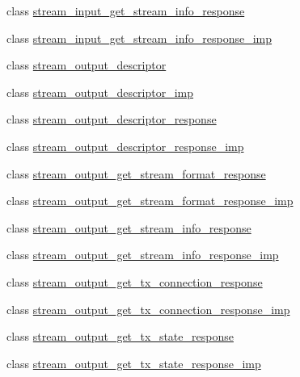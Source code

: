 \begin{DoxyCompactItemize}
\item 
class \hyperlink{classavdecc__lib_1_1stream__input__get__stream__info__response}{stream\+\_\+input\+\_\+get\+\_\+stream\+\_\+info\+\_\+response}
\item 
class \hyperlink{classavdecc__lib_1_1stream__input__get__stream__info__response__imp}{stream\+\_\+input\+\_\+get\+\_\+stream\+\_\+info\+\_\+response\+\_\+imp}
\item 
class \hyperlink{classavdecc__lib_1_1stream__output__descriptor}{stream\+\_\+output\+\_\+descriptor}
\item 
class \hyperlink{classavdecc__lib_1_1stream__output__descriptor__imp}{stream\+\_\+output\+\_\+descriptor\+\_\+imp}
\item 
class \hyperlink{classavdecc__lib_1_1stream__output__descriptor__response}{stream\+\_\+output\+\_\+descriptor\+\_\+response}
\item 
class \hyperlink{classavdecc__lib_1_1stream__output__descriptor__response__imp}{stream\+\_\+output\+\_\+descriptor\+\_\+response\+\_\+imp}
\item 
class \hyperlink{classavdecc__lib_1_1stream__output__get__stream__format__response}{stream\+\_\+output\+\_\+get\+\_\+stream\+\_\+format\+\_\+response}
\item 
class \hyperlink{classavdecc__lib_1_1stream__output__get__stream__format__response__imp}{stream\+\_\+output\+\_\+get\+\_\+stream\+\_\+format\+\_\+response\+\_\+imp}
\item 
class \hyperlink{classavdecc__lib_1_1stream__output__get__stream__info__response}{stream\+\_\+output\+\_\+get\+\_\+stream\+\_\+info\+\_\+response}
\item 
class \hyperlink{classavdecc__lib_1_1stream__output__get__stream__info__response__imp}{stream\+\_\+output\+\_\+get\+\_\+stream\+\_\+info\+\_\+response\+\_\+imp}
\item 
class \hyperlink{classavdecc__lib_1_1stream__output__get__tx__connection__response}{stream\+\_\+output\+\_\+get\+\_\+tx\+\_\+connection\+\_\+response}
\item 
class \hyperlink{classavdecc__lib_1_1stream__output__get__tx__connection__response__imp}{stream\+\_\+output\+\_\+get\+\_\+tx\+\_\+connection\+\_\+response\+\_\+imp}
\item 
class \hyperlink{classavdecc__lib_1_1stream__output__get__tx__state__response}{stream\+\_\+output\+\_\+get\+\_\+tx\+\_\+state\+\_\+response}
\item 
class \hyperlink{classavdecc__lib_1_1stream__output__get__tx__state__response__imp}{stream\+\_\+output\+\_\+get\+\_\+tx\+\_\+state\+\_\+response\+\_\+imp}

\end{DoxyCompactItemize}
